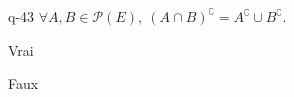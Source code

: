 \begin{truefalse}{q-43}
$\forall A,B\in\mathcal{P}(E),\ (A\cap B)^{\complement}=A^{\complement}\cup B^{\complement}.$ 
\item* Vrai
\item Faux
\end{truefalse}

